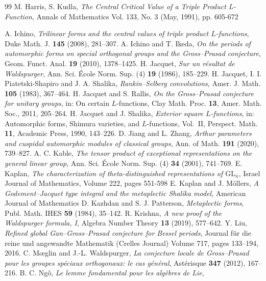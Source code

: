 \documentclass[11pt,oneside,notitlepage]{book}
\numberwithin{equation}{section}
\theoremstyle{plain}
\theoremstyle{definition}
\newcommand{\GL}{\mathrm{GL}}
\begin{document}
\begin{thebibliography}{99}
	 M. Harris, S. Kudla, \emph{The Central Critical Value of a Triple Product L-Function}, Annals of Mathematics Vol. 133, No. 3 (May, 1991), pp. 605-672
	
	 A. Ichino, \emph{Trilinear forms and the central values of triple product $L$-functions}, Duke Math. J. \textbf{145} (2008), 281--307.
	 A. Ichino and T. Ikeda, \emph{On the periods of automorphic forms on special orthogonal groups and the Gross--Prasad conjecture}, Geom. Funct. Anal. \textbf{19} (2010), 1378--1425.
	 H. Jacquet, \emph{Sur un r\'esultat de Waldspurger}, Ann. Sci. \'Ecole Norm. Sup. (4) \textbf{19} (1986), 185--229.
	 H. Jacquet, I. I. Piatetski-Shapiro and J. A. Shalika, \emph{Rankin--Selberg convolutions}, Amer. J. Math. \textbf{105} (1983), 367--464.
	 H. Jacquet and S. Rallis, \emph{On the Gross--Prasad conjecture for unitary groups}, in: On certain $L$-functions, Clay Math. Proc. \textbf{13}, Amer. Math. Soc., 2011, 205--264.
	 H. Jacquet and J. Shalika, \emph{Exterior square $L$-functions}, in: Automorphic forms, Shimura varieties, and $L$-functions, Vol.~II, Perspect. Math. \textbf{11}, Academic Press, 1990, 143--226.
	 D. Jiang and L. Zhang, \emph{Arthur parameters and cuspidal automorphic modules of classical groups}, Ann. of Math. \textbf{191} (2020), 739--827.
	 A. C. Kable, \emph{The tensor product of exceptional representations on the general linear group}, Ann. Sci. \'Ecole Norm. Sup. (4) \textbf{34} (2001), 741--769.
		 E. Kaplan, \emph{The characterization of theta-distinguished representations of $\GL_n$}, Israel Journal of Mathematics, Volume 222, pages 551-598
	 E. Kaplan and J. M\"ollers, \emph{A Godement--Jacquet type integral and the metaplectic Shalika model}, American Journal of Mathematics
	 D. Kazhdan and S. J. Patterson, \emph{Metaplectic forms}, Publ. Math. IHES \textbf{59} (1984), 35--142.
	 R. Krishna, \emph{A new proof of the Waldspurger formula, I}, Algebra Number Theory \textbf{13} (2019), 577--642.
	 Y. Liu, \emph{Refined global Gan--Gross--Prasad conjecture for Bessel periods},  Journal f\"ur die reine und angewandte Mathematik (Crelles Journal) Volume 717, pages 133--194, 2016.
	 C. M\oe glin and J.-L. Waldspurger, \emph{La conjecture locale de Gross--Prasad pour les groupes sp\'eciaux orthogonaux: le cas g\'en\'eral}, Ast\'erisque \textbf{347} (2012), 167--216.
	B. C. Ng\^o,
	\emph{Le lemme fondamental pour les alg\`ebres de Lie},

\end{thebibliography}
\end{document}
